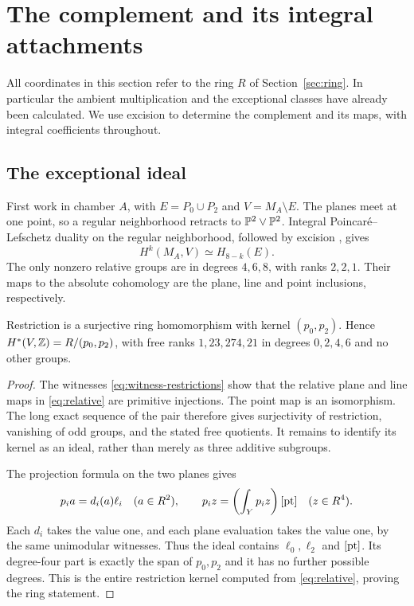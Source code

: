 \section{The complement and its integral attachments}\label{sec:attachments}

All coordinates in this section refer to the ring $R$ of
Section~\ref{sec:ring}. In particular the ambient multiplication
and the exceptional classes have already been calculated. We use
excision to determine the complement and its maps, with integral
coefficients throughout.

\subsection{The exceptional ideal}
First work in chamber $A$, with $E=P_0\cup P_2$ and $V=M_A\setminus E$.
The planes meet at one point, so a regular neighborhood retracts
to $\mathbb P^2\vee\mathbb P^2$. Integral Poincar\'e--Lefschetz duality on the regular neighborhood,
followed by excision \cite[Theorem~3.43]{hatcher}, gives
\begin{equation}\label{eq:relative}
 H^k(M_A,V)\simeq H_{8-k}(E).
\end{equation}
The only nonzero relative groups are in degrees $4,6,8$, with
ranks $2,2,1$. Their maps to the absolute cohomology are the
plane, line and point inclusions, respectively.

\begin{proposition}\label{prop:complement}
Restriction is a surjective ring homomorphism with kernel
$(p_0,p_2)$. Hence $H^*(V,\mathbb Z)=R/(p_0,p_2)$, with free ranks
$1,23,274,21$ in degrees $0,2,4,6$ and no other groups.
\end{proposition}

\begin{proof}
The witnesses \eqref{eq:witness-restrictions} show that the
relative plane and line maps in \eqref{eq:relative} are
primitive injections. The point map is an isomorphism. The
long exact sequence of the pair therefore gives surjectivity
of restriction, vanishing of odd groups, and the stated free
quotients. It remains to identify its kernel as an ideal,
rather than merely as three additive subgroups.

The projection formula on the two planes gives
\begin{equation}\label{eq:ideal-products}
 p_i a=d_i(a)\ell_i\quad(a\in R^2),\qquad
 p_i z=\left(\int_Yp_i z\right)[\mathrm{pt}]\quad(z\in R^4).
\end{equation}
Each $d_i$ takes the value one, and each plane evaluation
takes the value one, by the same unimodular witnesses. Thus
the ideal contains $\ell_0,\ell_2$ and $[\mathrm{pt}]$. Its degree-four
part is exactly the span of $p_0,p_2$ and it has no further
possible degrees. This is the entire restriction kernel
computed from \eqref{eq:relative}, proving the ring statement.
\end{proof}

